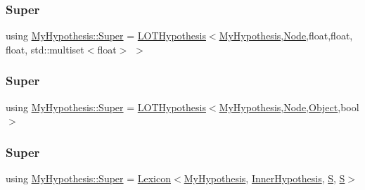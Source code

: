 \subsubsection{\texorpdfstring{Super}{Super}\hspace{0.1cm}{\footnotesize\ttfamily [1/3]}}
{\footnotesize\ttfamily using \hyperlink{class_my_hypothesis_a266742f266abc638ddc1d1870d735313}{My\+Hypothesis\+::\+Super} =  \hyperlink{class_l_o_t_hypothesis}{L\+O\+T\+Hypothesis}$<$\hyperlink{class_my_hypothesis}{My\+Hypothesis},\hyperlink{class_node}{Node},float,float, float, std\+::multiset$<$float$>$ $>$}

\mbox{\label{class_my_hypothesis_a8621c1813f3fb8590df10e75be30d4cb}} 
\subsubsection{\texorpdfstring{Super}{Super}\hspace{0.1cm}{\footnotesize\ttfamily [2/3]}}
{\footnotesize\ttfamily using \hyperlink{class_my_hypothesis_a266742f266abc638ddc1d1870d735313}{My\+Hypothesis\+::\+Super} =  \hyperlink{class_l_o_t_hypothesis}{L\+O\+T\+Hypothesis}$<$\hyperlink{class_my_hypothesis}{My\+Hypothesis},\hyperlink{class_node}{Node},\hyperlink{struct_object}{Object},bool$>$}

\mbox{\label{class_my_hypothesis_a266742f266abc638ddc1d1870d735313}} 
\subsubsection{\texorpdfstring{Super}{Super}\hspace{0.1cm}{\footnotesize\ttfamily [3/3]}}
{\footnotesize\ttfamily using \hyperlink{class_my_hypothesis_a266742f266abc638ddc1d1870d735313}{My\+Hypothesis\+::\+Super} =  \hyperlink{class_lexicon}{Lexicon}$<$\hyperlink{class_my_hypothesis}{My\+Hypothesis}, \hyperlink{class_inner_hypothesis}{Inner\+Hypothesis}, \hyperlink{_formal_language_theory-_complex_2_main_8cpp_a51c40915539205f0b5add30b0d68a4cb}{S}, \hyperlink{_formal_language_theory-_complex_2_main_8cpp_a51c40915539205f0b5add30b0d68a4cb}{S}$>$}



